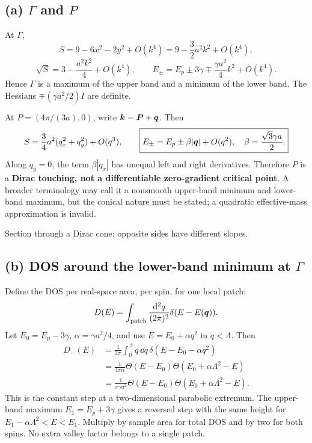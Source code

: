 \subsection*{(a) $\Gamma$ and $P$}
At $\Gamma$,
\[
S=9-6x^2-2y^2+O(k^4)=9-\frac32a^2k^2+O(k^4),
\]
\[
\sqrt S=3-\frac{a^2k^2}{4}+O(k^4),\qquad
E_\pm=E_p\pm3\gamma\mp\frac{\gamma a^2}{4}k^2+O(k^4).
\]
Hence $\Gamma$ is a maximum of the upper band and a minimum of the lower band. The Hessians $\mp(\gamma a^2/2)I$ are definite.

At $P=(4\pi/(3a),0)$, write $\boldsymbol{k}=\boldsymbol{P}+\boldsymbol{q}$. Then
\[
S=\frac34a^2(q_x^2+q_y^2)+O(q^3),\qquad
\boxed{E_\pm=E_p\pm\beta|\boldsymbol{q}|+O(q^2),\quad\beta=\frac{\sqrt3\gamma a}{2}.}
\]
Along $q_y=0$, the term $\beta|q_x|$ has unequal left and right derivatives. Therefore $P$ is a \textbf{Dirac touching, not a differentiable zero-gradient critical point}. A broader terminology may call it a nonsmooth upper-band minimum and lower-band maximum, but the conical nature must be stated; a quadratic effective-mass approximation is invalid.

\begin{center}

\small Section through a Dirac cone: opposite sides have different slopes.
\end{center}

\subsection*{(b) DOS around the lower-band minimum at $\Gamma$}
Define the DOS per real-space area, per spin, for one local patch:
\[
D(E)=\int_{\rm patch}\frac{\mathop{}\!\mathrm{d}^2q}{(2\pi)^2}\delta(E-E(\boldsymbol{q})).
\]
Let $E_0=E_p-3\gamma$, $\alpha=\gamma a^2/4$, and use $E=E_0+\alpha q^2$ in $q<\Lambda$. Then
\begin{align*}
D_-(E)&=\frac1{2\pi}\int_0^\Lambda q\,\dd q\,\delta(E-E_0-\alpha q^2)\\
&=\boxed{\frac1{4\pi\alpha}\Theta(E-E_0)\Theta(E_0+\alpha\Lambda^2-E)}\\
&=\frac1{\pi\gamma a^2}\Theta(E-E_0)\Theta(E_0+\alpha\Lambda^2-E).
\end{align*}
This is the constant step at a two-dimensional parabolic extremum. The upper-band maximum $E_1=E_p+3\gamma$ gives a reversed step with the same height for $E_1-\alpha\Lambda^2<E<E_1$. Multiply by sample area for total DOS and by two for both spins. No extra valley factor belongs to a single patch.

